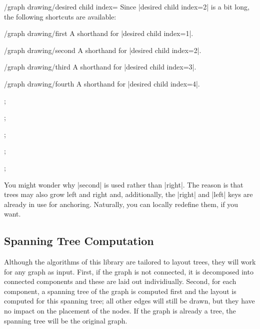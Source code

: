 \begin{key}{/graph drawing/desired child index=}
  Since |desired child index=2| is a bit long, the following shortcuts
  are available:
  \begin{key}{/graph drawing/first}
    A shorthand for |desired child index=1|.    
  \end{key}
  \begin{key}{/graph drawing/second}
    A shorthand for |desired child index=2|.    
  \end{key}
  \begin{key}{/graph drawing/third}
    A shorthand for |desired child index=3|.    
  \end{key}
  \begin{key}{/graph drawing/fourth}
    A shorthand for |desired child index=4|.    
  \end{key}
\begin{codeexample}[]
\tikz {};  
\end{codeexample}
\begin{codeexample}[]
\tikz {};  
\end{codeexample}
\begin{codeexample}[]
\tikz {};  
\end{codeexample}
\begin{codeexample}[]
\tikz {};  
\end{codeexample}
\begin{codeexample}[]
\tikz {};  
\end{codeexample}
  You might wonder why |second| is used rather than |right|. The
  reason is that trees may also grow left and right and, additionally,
  the |right| and |left| keys are already in use for
  anchoring. Naturally, you can locally redefine them, if you want.
\end{key}


\subsection{Spanning Tree Computation}
\label{subsection-gd-spanning-tree}
Although the algorithms of this library are tailored to layout trees,
they will work for any graph as input. First, if the graph is not
connected, it is decomposed into connected components and these are
laid out individiually. Second, for each component, a spanning tree of
the graph is computed first and the layout is computed for this
spanning tree; all other edges will still be drawn, but they have no
impact on the placement of the nodes. If the graph is already a tree,
the spanning tree will be the original graph.

